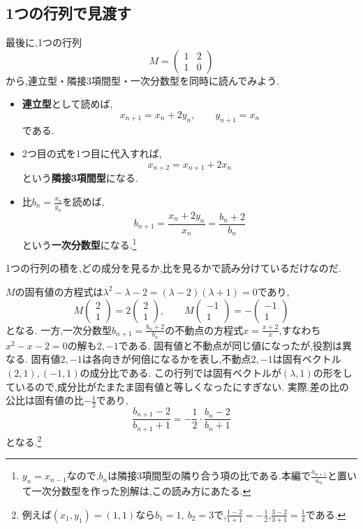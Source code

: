 \subsection{1つの行列で見渡す}\label{節：1つの行列で見渡す}
最後に,1つの行列
\[
  M=\begin{pmatrix}1&2\\1&0\end{pmatrix}
\]
から,連立型・隣接3項間型・一次分数型を同時に読んでみよう.
\begin{itemize}
  \item \textbf{連立型}として読めば,
    \[
      x_{n+1}=x_n+2y_n,\qquad y_{n+1}=x_n
    \]
    である.
  \item 2つ目の式を1つ目に代入すれば,
    \[
      x_{n+2}=x_{n+1}+2x_n
    \]
    という\textbf{隣接3項間型}になる.
  \item 比$b_n=\frac{x_n}{y_n}$を読めば,
    \[
      b_{n+1}=\frac{x_n+2y_n}{x_n}=\frac{b_n+2}{b_n}
    \]
    という\textbf{一次分数型}になる.\footnote{$y_n=x_{n-1}$なので,$b_n$は隣接3項間型の隣り合う項の比である.本編で$\frac{a_{n+1}}{a_n}$と置いて一次分数型を作った別解は,この読み方にあたる.}
\end{itemize}
1つの行列の積を,どの成分を見るか,比を見るかで読み分けているだけなのだ.

$M$の固有値の方程式は$\lambda^2-\lambda-2=(\lambda-2)(\lambda+1)=0$であり,
\[
  M\begin{pmatrix}2\\1\end{pmatrix}=2\begin{pmatrix}2\\1\end{pmatrix},
  \qquad
  M\begin{pmatrix}-1\\1\end{pmatrix}=-\begin{pmatrix}-1\\1\end{pmatrix}
\]
となる.
一方,一次分数型$b_{n+1}=\frac{b_n+2}{b_n}$の不動点の方程式$x=\frac{x+2}{x}$,すなわち$x^2-x-2=0$の解も$2,-1$である.
固有値と不動点が同じ値になったが,役割は異なる.
固有値$2,-1$は各向きが何倍になるかを表し,不動点$2,-1$は固有ベクトル$(2,1),(-1,1)$の成分比である.
この行列では固有ベクトルが$(\lambda,1)$の形をしているので,成分比がたまたま固有値と等しくなったにすぎない.
実際,差の比の公比は固有値の比$-\frac12$であり,
\[
  \frac{b_{n+1}-2}{b_{n+1}+1}=-\frac12\cdot\frac{b_n-2}{b_n+1}
\]
となる.\footnote{例えば$(x_1,y_1)=(1,1)$なら$b_1=1,\ b_2=3$で,$\frac{1-2}{1+1}=-\frac12$,$\frac{3-2}{3+1}=\frac14$である.}

